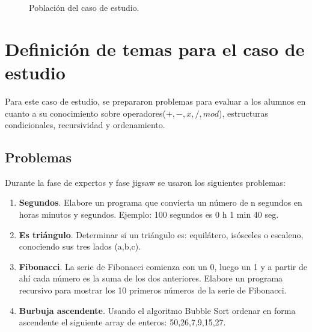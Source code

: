 \begin{figure}
	\centering
	\caption{Población del caso de estudio.}
	\label{fig:c5_poblacion}
\end{figure}
\newpage
\section{Definición de temas para el caso de estudio}
\label{sec:problemas}
Para este caso de estudio, se prepararon problemas para evaluar a los alumnos en cuanto a su conocimiento sobre operadores($+,-,x,/, mod$), estructuras condicionales, recursividad y ordenamiento.

\subsection{Problemas}

Durante la fase de expertos y fase jigsaw se usaron los siguientes problemas:

\begin{enumerate}
	\item \textbf{Segundos}. Elabore un programa que convierta un número de n segundos en horas minutos y segundos. Ejemplo: 100 segundos es 0 h 1 min 40 seg.
	\item \textbf{Es triángulo}. Determinar si un triángulo es: equilátero, isósceles o escaleno, conociendo sus tres lados (a,b,c).
	\item \textbf{Fibonacci}. La serie de Fibonacci comienza con un 0, luego un 1 y a partir de ahí cada número es la suma de los dos anteriores. Elabore un programa recursivo para mostrar los 10 primeros números de la serie de Fibonacci.
	\item \textbf{Burbuja ascendente}. Usando el algoritmo Bubble Sort ordenar en forma ascendente el siguiente array de enteros: 50,26,7,9,15,27.
	
\end{enumerate}

